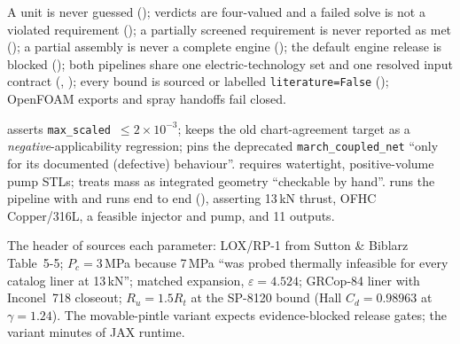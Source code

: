 A unit is never guessed (); verdicts are four-valued and a failed solve is not a violated requirement (); a partially screened requirement is never reported as met (); a partial assembly is never a complete engine (); the default engine release is blocked (); both pipelines share one electric-technology set and one resolved input contract (, ); every bound is sourced or labelled \texttt{literature=False} (); OpenFOAM exports and spray handoffs fail closed.

 asserts \texttt{max\_scaled}~$\le2\times10^{-3}$;  keeps the old chart-agreement target as a \emph{negative}-applicability regression;  pins the deprecated \texttt{march\_coupled\_net} ``only for its documented (defective) behaviour''.  requires watertight, positive-volume pump STLs;  treats mass as integrated geometry ``checkable by hand''.  runs the pipeline with  and runs  end to end (), asserting 13\,kN thrust, OFHC Copper/316L, a feasible injector and pump, and 11 outputs.

The header of  sources each parameter: LOX/RP-1 from Sutton \& Biblarz Table~5-5; $P_c=3$\,MPa because 7\,MPa ``was probed thermally infeasible for every catalog liner at 13\,kN''; matched expansion, $\varepsilon=4.524$; GRCop-84 liner with Inconel~718 closeout; $R_u=1.5R_t$ at the SP-8120 bound (Hall $C_d=0.98963$ at $\gamma=1.24$). The movable-pintle variant expects evidence-blocked release gates; the  variant minutes of JAX runtime.

